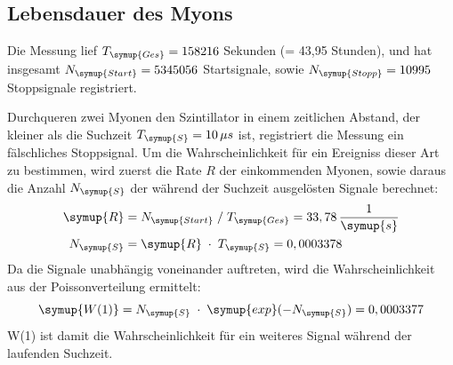 \subsection{Lebensdauer des Myons}
\label{sec:lebensdauer}

Die Messung lief $T_{\symup{Ges}}=158216$ Sekunden (= 43,95 Stunden), und hat insgesamt
$N_{\symup{Start}}=5345056$ Startsignale, sowie $N_{\symup{Stopp}}=10995$ Stoppsignale registriert.

\noindent
Durchqueren zwei Myonen den Szintillator in einem zeitlichen Abstand, der kleiner als die
Suchzeit $T_{\symup{S}}=10\,\mu s$ ist, registriert die Messung ein fälschliches Stoppsignal.
Um die Wahrscheinlichkeit für ein Ereigniss dieser Art zu bestimmen, wird zuerst die Rate $R$
der einkommenden Myonen, sowie daraus die Anzahl $N_{\symup{S}}$ der während der Suchzeit ausgelösten Signale
berechnet:
\begin{align*}
  \symup{R} &= N_{\symup{Start}}\;/\;T_{\symup{Ges}} = 33,78\,\frac{1}{\symup{s}}\\
  N_{\symup{S}} &= \symup{R}\;\cdot\;T_{\symup{S}} = 0,0003378\\
\end{align*}
Da die Signale unabhängig voneinander auftreten, wird die Wahrscheinlichkeit aus der
Poissonverteilung ermittelt:
\begin{equation*}
  \symup{W(1)} = N_{\symup{S}}\;\cdot\;\symup{exp}(-N_{\symup{S}}) = 0,0003377\\
\end{equation*}
W(1) ist damit die Wahrscheinlichkeit für ein weiteres Signal während der laufenden Suchzeit.

